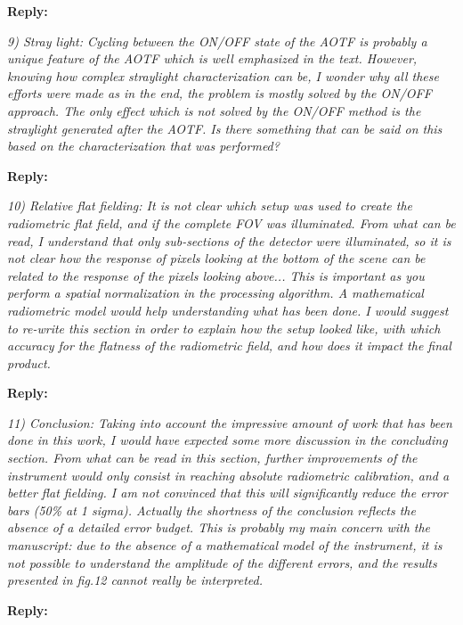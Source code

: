\documentclass[12pt, notitlepage]{article}
\begin{document}
\textbf{Reply:} 

\hrulefill

\textit{9) Stray light: Cycling between the ON/OFF state of the AOTF is probably a unique
feature of the AOTF which is well emphasized in the text. However, knowing how
complex straylight characterization can be, I wonder why all these efforts were made
as in the end, the problem is mostly solved by the ON/OFF approach. The only effect
which is not solved by the ON/OFF method is the straylight generated after the AOTF.
Is there something that can be said on this based on the characterization that was
performed?}

\textbf{Reply:} 

\hrulefill

\textit{10) Relative flat fielding: It is not clear which setup was used to create the radiometric
flat field, and if the complete FOV was illuminated. From what can be read, I understand
that only sub-sections of the detector were illuminated, so it is not clear how the
response of pixels looking at the bottom of the scene can be related to the response of
the pixels looking above... This is important as you perform a spatial normalization in
the processing algorithm. A mathematical radiometric model would help understanding
what has been done. I would suggest to re-write this section in order to explain how
the setup looked like, with which accuracy for the flatness of the radiometric field, and
how does it impact the final product.}

\textbf{Reply:} 

\hrulefill

\textit{11) Conclusion: Taking into account the impressive amount of work that has been done
in this work, I would have expected some more discussion in the concluding section.
From what can be read in this section, further improvements of the instrument would
only consist in reaching absolute radiometric calibration, and a better flat fielding. I am
not convinced that this will significantly reduce the error bars (50\% at 1 sigma). Actually
the shortness of the conclusion reflects the absence of a detailed error budget. This is
probably my main concern with the manuscript: due to the absence of a mathematical
model of the instrument, it is not possible to understand the amplitude of the different
errors, and the results presented in fig.12 cannot really be interpreted.}

\textbf{Reply:} 

\hrulefill
\end{document}
